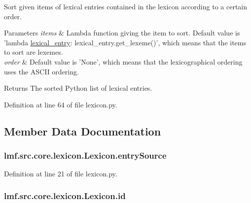Sort given items of lexical entries contained in the lexicon according to a certain order. 


\begin{DoxyParams}{Parameters}
{\em items} & Lambda function giving the item to sort. Default value is 'lambda \hyperlink{namespacelmf_1_1src_1_1core_1_1lexical__entry}{lexical\+\_\+entry}\+: lexical\+\_\+entry.\+get\+\_\+lexeme()', which means that the items to sort are lexemes. \\
\hline
{\em order} & Default value is 'None', which means that the lexicographical ordering uses the A\+S\+C\+I\+I ordering. \\
\hline
\end{DoxyParams}
\begin{DoxyReturn}{Returns}
The sorted Python list of lexical entries. 
\end{DoxyReturn}


Definition at line 64 of file lexicon.\+py.



\subsection{Member Data Documentation}
\hypertarget{classlmf_1_1src_1_1core_1_1lexicon_1_1_lexicon_a2c62e9663fe3771e684fb4ef94fe1d52}{
\subsubsection[{entry\+Source}]{\setlength{\rightskip}{0pt plus 5cm}lmf.\+src.\+core.\+lexicon.\+Lexicon.\+entry\+Source}}\label{classlmf_1_1src_1_1core_1_1lexicon_1_1_lexicon_a2c62e9663fe3771e684fb4ef94fe1d52}


Definition at line 21 of file lexicon.\+py.

\hypertarget{classlmf_1_1src_1_1core_1_1lexicon_1_1_lexicon_a8d47ac22571af27a1e989c2c7b14e80b}{
\subsubsection[{id}]{\setlength{\rightskip}{0pt plus 5cm}lmf.\+src.\+core.\+lexicon.\+Lexicon.\+id}}\label{classlmf_1_1src_1_1core_1_1lexicon_1_1_lexicon_a8d47ac22571af27a1e989c2c7b14e80b}


